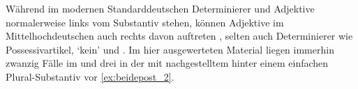 

Während im modernen Standarddeutschen Determinierer und Adjektive normalerweise
links vom Substantiv stehen, können Adjektive im Mittelhochdeutschen
auch rechts davon auftreten \autocite[185--186, 237--243]{ksw2}, selten auch
Determinierer wie Possessivartikel,  `kein' und 
\autocite[515--517, 551--552, 623--624]{ksw2}. Im hier ausgewerteten Material
liegen immerhin zwanzig Fälle im \CAO{} und drei in der \KC{}
mit nachgestelltem  hinter einem einfachen Plural-Substantiv vor
\cref{ex:beidepost_2}.

